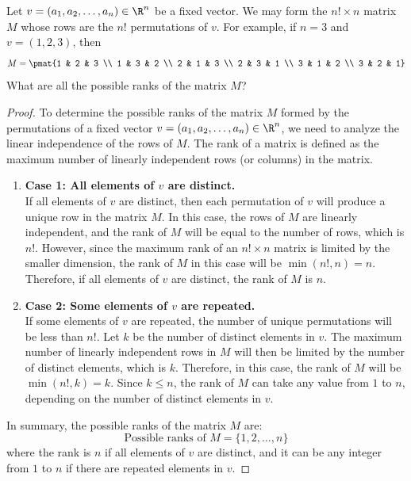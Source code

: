 \documentclass[openany]{book}
\begin{document}
\begin{exercise}
    Let $v = (a_1, a_2, \ldots , a_n) \in \R^n$ be a fixed vector. We may form the $n! \times n$ matrix $M$ whose rows are the $n!$ permutations of $v$. For example, if $n = 3$ and $v = (1, 2, 3)$, then
$$M = \pmat{1 & 2 & 3 \\ 1 & 3 & 2 \\ 2 & 1 & 3 \\ 2 & 3 & 1 \\ 3 & 1 & 2 \\ 3 & 2 & 1}$$
What are all the possible ranks of the matrix $M$?
\end{exercise}
\begin{proof}
To determine the possible ranks of the matrix $M$ formed by the permutations of a fixed vector $v = (a_1, a_2, \ldots, a_n) \in \R^n$, we need to analyze the linear independence of the rows of $M$. The rank of a matrix is defined as the maximum number of linearly independent rows (or columns) in the matrix.
\begin{enumerate}
    \item \textbf{Case 1: All elements of $v$ are distinct.} \\
    If all elements of $v$ are distinct, then each permutation of $v$ will produce a unique row in the matrix $M$. In this case, the rows of $M$ are linearly independent, and the rank of $M$ will be equal to the number of rows, which is $n!$. However, since the maximum rank of an $n! \times n$ matrix is limited by the smaller dimension, the rank of $M$ in this case will be $\min(n!, n) = n$. Therefore, if all elements of $v$ are distinct, the rank of $M$ is $n$.
    \item \textbf{Case 2: Some elements of $v$ are repeated.} \\
    If some elements of $v$ are repeated, the number of unique permutations will be less than $n!$. Let $k$ be the number of distinct elements in $v$. The maximum number of linearly independent rows in $M$ will then be limited by the number of distinct elements, which is $k$. Therefore, in this case, the rank of $M$ will be $\min(n!, k) = k$. Since $k \leq n$, the rank of $M$ can take any value from $1$ to $n$, depending on the number of distinct elements in $v$.
\end{enumerate}
In summary, the possible ranks of the matrix $M$ are:
$$\text{Possible ranks of } M = \{1, 2, \ldots, n\}$$
where the rank is $n$ if all elements of $v$ are distinct, and it can be any integer from $1$ to $n$ if there are repeated elements in $v$.
\end{proof}
\end{document}
